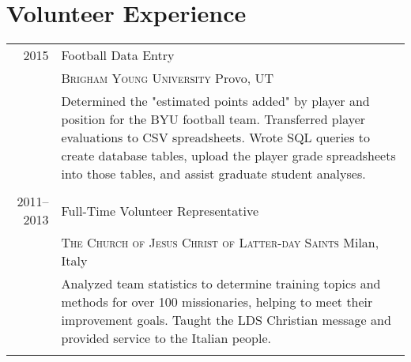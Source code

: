 \documentclass[a4paper,12pt]{article}
\begin{document}
\section{Volunteer Experience}
\begin{tabular}{r|p{11cm}}
  \textsc{2015} & Football Data Entry \\
  & \textsc{Brigham Young University} Provo, UT \\
  & \footnotesize{Determined the "estimated points added" by player and position for the BYU football team. Transferred player evaluations to CSV spreadsheets. Wrote SQL queries to create database tables, upload the player grade spreadsheets into those tables, and assist graduate student analyses.} \\ \multicolumn{2}{c}{} \\
  
  \textsc{2011--2013} & Full-Time Volunteer Representative \\
  & \textsc{The Church of Jesus Christ of Latter-day Saints} Milan, Italy \\
  & \footnotesize{Analyzed team statistics to determine training topics and methods for over 100 missionaries, helping to meet their improvement goals. Taught the LDS Christian message and provided service to the Italian people.} \\ \multicolumn{2}{c}{}
\end{tabular}


%   
%   
%   
\end{document}
